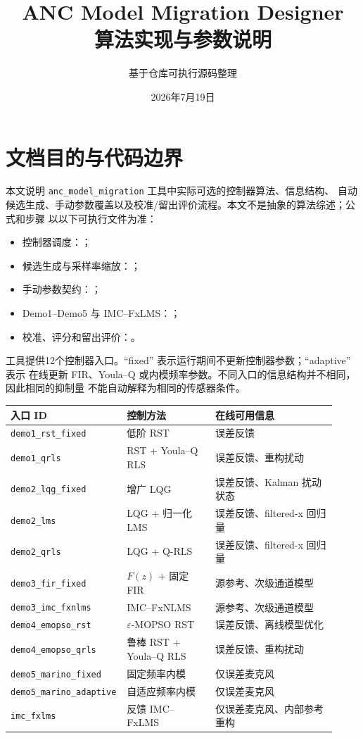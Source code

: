 \documentclass[UTF8,11pt,a4paper]{ctexart}
\title{ANC Model Migration Designer\\算法实现与参数说明}
\author{基于仓库可执行源码整理}
\date{2026年7月19日}
\begin{document}
\maketitle
\tableofcontents

\section{文档目的与代码边界}

本文说明 \texttt{anc\_model\_migration} 工具中实际可选的控制器算法、信息结构、
自动候选生成、手动参数覆盖以及校准/留出评价流程。本文不是抽象的算法综述；公式和步骤
以以下可执行文件为准：

\begin{itemize}
  \item 控制器调度：；
  \item 候选生成与采样率缩放：；
  \item 手动参数契约：；
  \item Demo1--Demo5 与 IMC--FxLMS：；
  \item 校准、评分和留出评价：。
\end{itemize}

工具提供12个控制器入口。``fixed'' 表示运行期间不更新控制器参数；``adaptive'' 表示
在线更新 FIR、Youla--Q 或内模频率参数。不同入口的信息结构并不相同，因此相同的抑制量
不能自动解释为相同的传感器条件。

\begin{longtable}{p{0.28\linewidth}p{0.27\linewidth}p{0.37\linewidth}}
\toprule
入口 ID & 控制方法 & 在线可用信息\\
\midrule
\endhead
\texttt{demo1\_rst\_fixed} & 低阶 RST & 误差反馈\\
\texttt{demo1\_qrls} & RST + Youla--Q RLS & 误差反馈、重构扰动\\
\texttt{demo2\_lqg\_fixed} & 增广 LQG & 误差反馈、Kalman 扰动状态\\
\texttt{demo2\_lms} & LQG + 归一化 LMS & 误差反馈、filtered-x 回归量\\
\texttt{demo2\_qrls} & LQG + Q-RLS & 误差反馈、filtered-x 回归量\\
\texttt{demo3\_fir\_fixed} & $F(z)$ + 固定 FIR & 源参考、次级通道模型\\
\texttt{demo3\_imc\_fxnlms} & IMC--FxNLMS & 源参考、次级通道模型\\
\texttt{demo4\_emopso\_rst} & $\varepsilon$-MOPSO RST & 误差反馈、离线模型优化\\
\texttt{demo4\_emopso\_qrls} & 鲁棒 RST + Youla--Q RLS & 误差反馈、重构扰动\\
\texttt{demo5\_marino\_fixed} & 固定频率内模 & 仅误差麦克风\\
\texttt{demo5\_marino\_adaptive} & 自适应频率内模 & 仅误差麦克风\\
\texttt{imc\_fxlms} & 反馈 IMC--FxLMS & 仅误差麦克风、内部参考重构\\
\bottomrule
\end{longtable}
\end{document}
